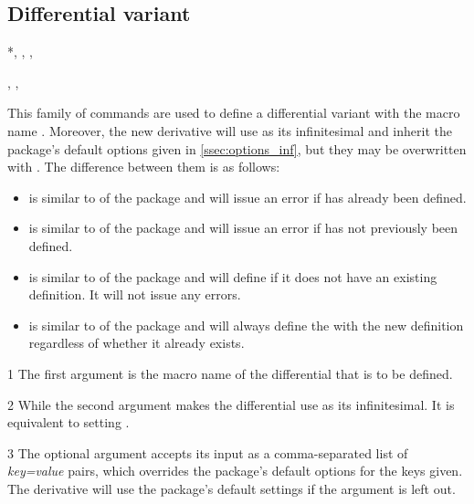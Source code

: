 	\subsection{Differential variant} \label{ssec:defvar_inf}
	
	\begin{function}*{\NewDifferential, \RenewDifferential, \ProvideDifferential, \DeclareDifferential}
		\begin{syntax}
			, , 
		\end{syntax}
		This family of commands are used to define a differential variant with the macro name . Moreover, the new derivative will use  as its infinitesimal and inherit the package's default options given in \cref{ssec:options_inf}, but they may be overwritten with . The difference between them is as follows:
		
		\begin{itemize}
			\item {} is similar to  of the  package and will issue an error if  has already been defined.
			\item {} is similar to  of the  package and will issue an error if  has not previously been defined.
			\item {} is similar to  of the  package and will define  if it does not have an existing definition. It will not issue any errors.
			\item {} is similar to  of the  package and will always define the  with the new definition regardless of whether it already exists.
		\end{itemize}
		
		\begin{argument}{1}
			The first argument is the macro name of the differential that is to be defined.
		\end{argument}
		
		\begin{argument}{2}
			While the second argument makes the differential  use  as its infinitesimal. It is equivalent to setting .
		\end{argument}
		
		\begin{argument}{3}
			The optional argument accepts its input as a comma-separated list of \emph{key=value} pairs, which overrides the package's default options for the keys given. The derivative  will use the package's default settings if the argument is left out.
		\end{argument}
	\end{function}
	
